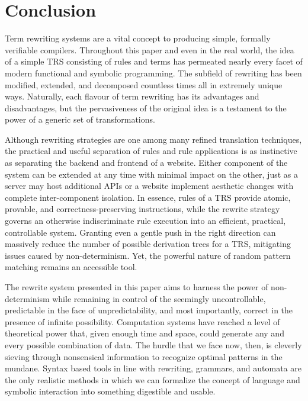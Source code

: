 \documentclass{article}
\begin{document}
\section{Conclusion}

Term rewriting systems are a vital concept to producing simple, formally verifiable compilers.
Throughout this paper and even in the real world, the idea of a simple TRS consisting of rules and terms
has permeated nearly every facet of modern functional and symbolic programming. The subfield of rewriting has been modified, extended, and decomposed
countless times all in extremely unique ways. Naturally, each flavour of term rewriting has its advantages and disadvantages, but the pervasiveness of the original idea
is a testament to the power of a generic set of transformations.

Although rewriting strategies are one among many refined translation techniques,
the practical and useful separation of rules and rule applications
is as instinctive as separating the backend and frontend of a website.
Either component of the system can be extended at any time with minimal impact on the other,
just as a server may host additional APIs or a website implement aesthetic changes with complete inter-component isolation.
In essence, rules of a TRS provide atomic, provable, and correctness-preserving instructions,
while the rewrite strategy governs an otherwise indiscriminate rule execution into an efficient, practical, controllable system.
Granting even a gentle push in the right direction can massively reduce the number of possible derivation trees for a TRS,
mitigating issues caused by non-determinism. Yet, the powerful nature of random pattern matching remains an accessible tool.

The rewrite system presented in this paper aims
to harness the power of non-determinism while remaining in control of the seemingly uncontrollable,
predictable in the face of unpredictability, and most importantly, correct in the presence of infinite possibility.
Computation systems have reached a level of theoretical power that, given enough time and space, could generate any and every possible
combination of data. The hurdle that we face now, then, is cleverly sieving through nonsensical information to recognize optimal patterns in the mundane.
Syntax based tools in line with rewriting, grammars, and automata are the only realistic methods in which we can formalize the concept of language and symbolic interaction
into something digestible and usable.

\pagebreak
\nocite{*} %
\printbibliography %
\end{document}
